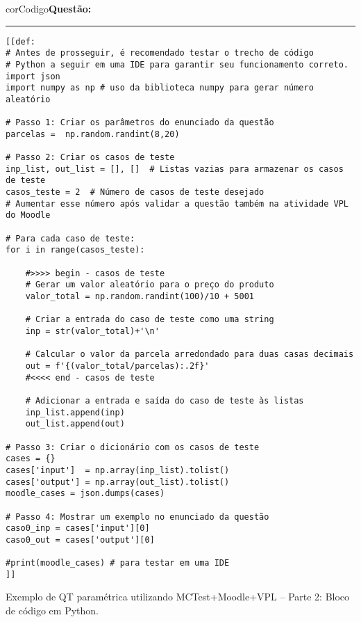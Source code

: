 

\begin{listing}[!ht]
\begin{myboxCode}{corCodigo}{\textbf{Questão: } }\vspace{3mm}
\hrule
\begin{verbatim}
[[def: 
# Antes de prosseguir, é recomendado testar o trecho de código  
# Python a seguir em uma IDE para garantir seu funcionamento correto.
import json
import numpy as np # uso da biblioteca numpy para gerar número aleatório 

# Passo 1: Criar os parâmetros do enunciado da questão
parcelas =  np.random.randint(8,20)

# Passo 2: Criar os casos de teste
inp_list, out_list = [], []  # Listas vazias para armazenar os casos de teste
casos_teste = 2  # Número de casos de teste desejado
# Aumentar esse número após validar a questão também na atividade VPL do Moodle

# Para cada caso de teste:
for i in range(casos_teste):    

    #>>>> begin - casos de teste
    # Gerar um valor aleatório para o preço do produto
    valor_total = np.random.randint(100)/10 + 5001 

    # Criar a entrada do caso de teste como uma string
    inp = str(valor_total)+'\n'

    # Calcular o valor da parcela arredondado para duas casas decimais
    out = f'{(valor_total/parcelas):.2f}'
    #<<<< end - casos de teste

    # Adicionar a entrada e saída do caso de teste às listas
    inp_list.append(inp)
    out_list.append(out)

# Passo 3: Criar o dicionário com os casos de teste
cases = {}
cases['input']  = np.array(inp_list).tolist()
cases['output'] = np.array(out_list).tolist()
moodle_cases = json.dumps(cases)

# Passo 4: Mostrar um exemplo no enunciado da questão
caso0_inp = cases['input'][0]
caso0_out = cases['output'][0]

#print(moodle_cases) # para testar em uma IDE
]]
\end{verbatim}
\end{myboxCode}
\caption{Exemplo de QT paramétrica utilizando MCTest+Moodle+VPL -- Parte 2: Bloco de código em Python.}
\label{lst:questaoQT_EP_1_parte2}
\end{listing}

